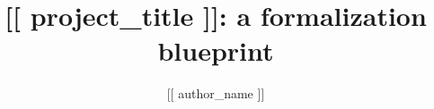 \title{[[ project_title ]]: a formalization blueprint}
\author{[[ author_name ]]}
\newtheorem{theorem}{Theorem}[chapter]
\newtheorem{lemma}[theorem]{Lemma}
\newtheorem{definition}[theorem]{Definition}
